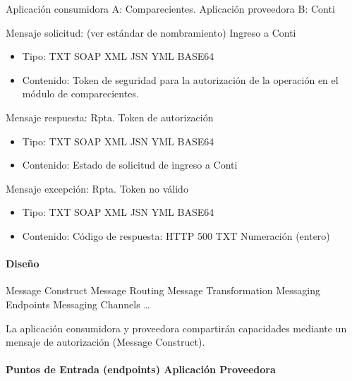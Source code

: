 \documentclass[
  paper=a4,
  ,captions=tableheading
]{scrartcl}
\providecommand{\tightlist}{%
  \setlength{\itemsep}{0pt}\setlength{\parskip}{0pt}}
\begin{document}
Aplicación consumidora A: Comparecientes. Aplicación proveedora B: Conti

Mensaje solicitud: (ver estándar de nombramiento) Ingreso a Conti

\begin{itemize}
\tightlist
\item
  Tipo: TXT \textbar{} SOAP \textbar{} XML \textbar{} JSN \textbar{} YML
  \textbar{} BASE64
\item
  Contenido: Token de seguridad para la autorización de la operación en
  el módulo de comparecientes.
\end{itemize}

Mensaje respuesta: Rpta. Token de autorización

\begin{itemize}
\tightlist
\item
  Tipo: TXT \textbar{} SOAP \textbar{} XML \textbar{} JSN \textbar{} YML
  \textbar{} BASE64
\item
  Contenido: Estado de solicitud de ingreso a Conti
\end{itemize}

Mensaje excepción: Rpta. Token no válido

\begin{itemize}
\tightlist
\item
  Tipo: TXT \textbar{} SOAP \textbar{} XML \textbar{} JSN \textbar{} YML
  \textbar{} BASE64
\item
  Contenido: Código de respuesta: HTTP 500 \textbar{} TXT \textbar{}
  Numeración (entero)
\end{itemize}

\paragraph{Diseño}\label{sec:diseuxf1o}

Message Construct \textbar{} Message Routing \textbar{} Message
Transformation \textbar{} Messaging Endpoints \textbar{} Messaging
Channels \textbar{} \ldots{}

La aplicación consumidora y proveedora compartirán capacidades mediante
un mensaje de autorización (Message Construct).

\paragraph{Puntos de Entrada (endpoints) Aplicación
Proveedora}\label{sec:puntos-de-entrada-endpoints-aplicaciuxf3n-proveedora}
\end{document}
